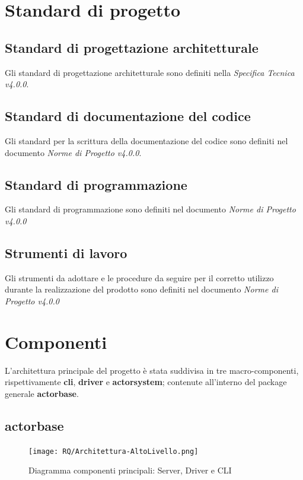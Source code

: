\documentclass{scalatekids-article}
\begin{document}
\newpage

\section{Standard di progetto}

\subsection{Standard di progettazione architetturale}
Gli standard di progettazione architetturale sono definiti nella
\textit{Specifica Tecnica v4.0.0}.

\subsection{Standard di documentazione del codice}
Gli standard per la scrittura della documentazione del codice sono definiti nel
documento \textit{Norme di Progetto v4.0.0}.

\subsection{Standard di programmazione}
Gli standard di programmazione sono definiti nel documento \textit{Norme di Progetto v4.0.0}

\subsection{Strumenti di lavoro}
Gli strumenti da adottare e le procedure da seguire per il corretto utilizzo
durante la realizzazione del prodotto sono definiti nel documento \textit{Norme
  di Progetto v4.0.0}

\section{Componenti}

L'architettura principale del progetto è stata suddivisa in tre macro-componenti, rispettivamente
\textbf{cli}, \textbf{driver} e \textbf{actorsystem}; contenute all'interno del package
generale \textbf{actorbase}.

\subsection{actorbase}
\label{sec:actorbase}

\begin{figure}[H]
  \begin{center}
    \texttt{[image: RQ/Architettura-AltoLivello.png]}
    \caption{Diagramma componenti principali: Server, Driver e CLI}
  \end{center}
\end{figure}
\end{document}
